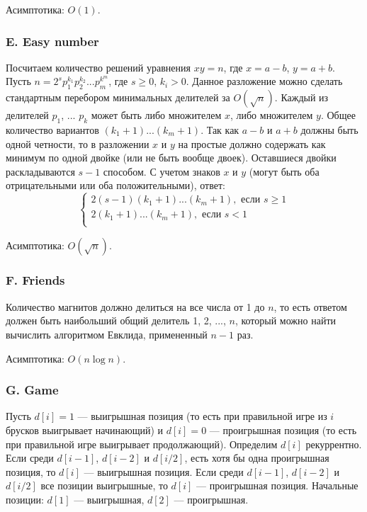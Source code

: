 Асимптотика: $O(1)$.


\subsubsection*{E. Easy number}


Посчитаем количество решений уравнения $x y = n$, где $x = a - b$, $y = a + b$. Пусть $n = 2^s p_1^{k_1} p_2^{k_2} ... p_m^{k^m}$, где $s \geqslant 0$, $k_i > 0$. Данное разложение можно сделать стандартным перебором минимальных делителей за $O(\sqrt{n})$. Каждый из делителей $p_1$, ... $p_k$ может быть либо множителем $x$, либо множителем $y$. Общее количество вариантов $(k_1 + 1) ... (k_m + 1)$. Так как $a-b$ и $a+b$ должны быть одной четности, то в разложении $x$ и $y$ на простые должно содержать как минимум по одной двойке (или не быть вообще двоек). Оставшиеся двойки раскладываются $s - 1$ способом. С учетом знаков $x$ и $y$ (могут быть оба отрицательными или оба положительными), ответ:
$$
\begin{cases}
2 (s - 1) (k_1 + 1) ... (k_m + 1), \text{ если } s \geqslant 1 \\
2 (k_1 + 1) ... (k_m + 1), \text{ если } s < 1 \\
\end{cases}
$$

Асимптотика: $O(\sqrt{n})$.



\subsubsection*{F. Friends}


Количество магнитов должно делиться на все числа от 1 до $n$, то есть ответом должен быть наибольший общий делитель 1, 2, ..., $n$, который можно найти вычислить алгоритмом Евклида, примененный $n-1$ раз.

Асимптотика: $O(n \log{n})$.



\subsubsection*{G. Game}


Пусть $d[i] = 1$ --- выигрышная позиция (то есть при правильной игре из $i$ брусков выигрывает начинающий) и $d[i] = 0$ --- проигрышная позиция (то есть при правильной игре выигрывает продолжающий). Определим $d[i]$ рекуррентно. Если среди $d[i-1]$, $d[i-2]$ и $d[i / 2]$, есть хотя бы одна проигрышная позиция, то $d[i]$ --- выигрышная позиция. Если среди $d[i-1]$, $d[i-2]$ и $d[i / 2]$ все позиции выигрышные, то $d[i]$ --- проигрышная позиция. Начальные позиции: $d[1]$ --- выигрышная, $d[2]$ --- проигрышная.

